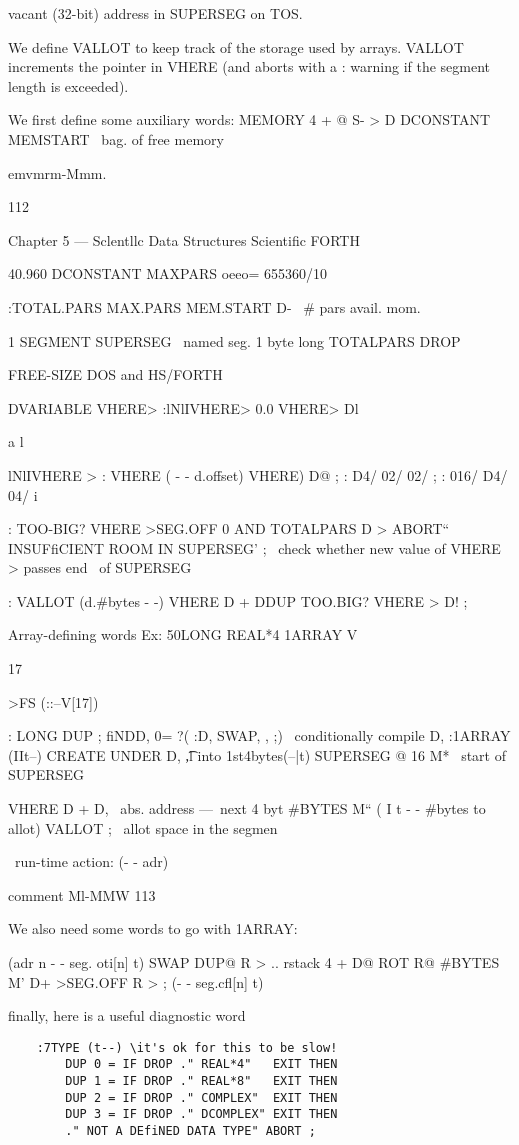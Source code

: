 {{vacant (32-bit) address in SUPERSEG on TOS.

We define VALLOT to keep track of the storage used by arrays.
VALLOT increments the pointer in VHERE (and aborts with a
: warning if the segment length is exceeded).

We first define some auxiliary words:
MEMORY 4 + @
S- > D DCONSTANT MEMSTART
\ bag. of free memory

emvmrm-Mmm.

112

Chapter 5 — Sclentllc Data Structures Scientific FORTH

40.960 DCONSTANT MAXPARS \4oeeo= 655360/10

:TOTAL.PARS MAX.PARS MEM.START D-
\ # pars avail. mom.

1 SEGMENT SUPERSEG \ named seg. 1 byte long
TOTALPARS DROP

FREE-SIZE \tell DOS and HS/FORTH

DVARIABLE VHERE>
:lNlIVHERE> 0.0 VHERE> Dl

a
l

lNlIVHERE >
: VHERE ( - - d.offset) VHERE) D@ ;
: D4/ 02/ 02/ ; : 016/ D4/ 04/ i

: TOO-BIG? VHERE >SEG.OFF
0 AND TOTALPARS D >
ABORT“ INSUFfiCIENT ROOM IN SUPERSEG' ;
\ check whether new value of VHERE > passes end
\ of SUPERSEG

: VALLOT (d.#bytes - -)
VHERE D + DDUP TOO.BIG?
VHERE > D! ;

Array-defining words
Ex: 50LONG REAL*4 1ARRAY V{

17} >FS (::--V[17])

: LONG DUP ;
fiNDD, 0= ?( :D, SWAP, , ;)
\ conditionally compile D,
:1ARRAY (IIt--)
CREATE UNDER D, \t,l into 1st4bytes(--|t)
SUPERSEG @ 16 M* \ start of SUPERSEG

VHERE D + D, \ abs. address —~next 4 byt
#BYTES M“ ( I t - - #bytes to allot)
VALLOT ; \ allot space in the segmen

\ run-time action: (- - adr)

comment Ml-MMW 113

We also need some words to go with 1ARRAY:

(adr n - - seg. oti[n] t)
SWAP DUP@ R > \fypo .. rstack
4 + D@
ROT R@ #BYTES M'
D+ >SEG.OFF R > ; (- - seg.cfl[n] t)

finally, here is a useful diagnostic word

\begin{lstlisting}
    :7TYPE (t--) \it's ok for this to be slow!
        DUP 0 = IF DROP ." REAL*4"   EXIT THEN
        DUP 1 = IF DROP ." REAL*8"   EXIT THEN
        DUP 2 = IF DROP ." COMPLEX"  EXIT THEN
        DUP 3 = IF DROP ." DCOMPLEX" EXIT THEN
        ." NOT A DEfiNED DATA TYPE" ABORT ;
\end{lstlisting}

}}
